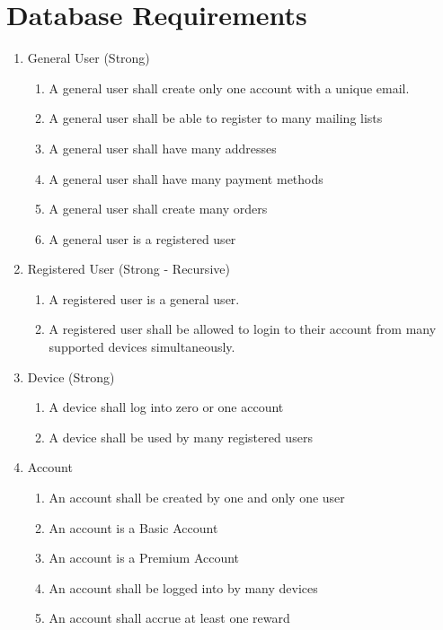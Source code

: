 \pagebreak
\section{Database Requirements}

\begin{enumerate}

\item General User (Strong)
\begin{enumerate}
	\item A general user shall create only one account with a unique email.
	\item A general user shall be able to register to many mailing lists
	\item A general user shall have many addresses
	\item A general user shall have many payment methods
	\item A general user shall create many orders
	\item A general user is a registered user
\end{enumerate}
	
\item Registered User (Strong - Recursive)
\begin{enumerate}
	\item A registered user is a general user.
	\item A registered user shall be allowed to login to their account from many supported devices simultaneously.
\end{enumerate}
	
\item Device (Strong)
\begin{enumerate}
	\item A device shall log into zero or one account
	\item A device shall be used by many registered users
\end{enumerate}

\item Account
\begin{enumerate}
	\item An account shall be created by one and only one user
	\item An account is a Basic Account
	\item An account is a Premium Account
	\item An account shall be logged into by many devices
	\item An account shall accrue at least one reward
\end{enumerate}
	

\end{enumerate}
